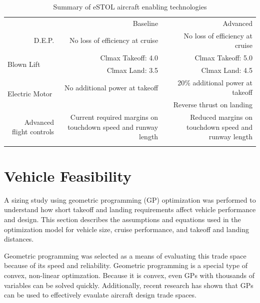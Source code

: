 \documentclass[]{aiaa-tc}%
\begin{document}
\begin{table}[htbp]
  \centering
  \caption{Summary of eSTOL aircraft enabling technologies}
    \begin{tabular}{rrr}
          &       &  \\
    \midrule
          & \multicolumn{1}{p{14.915em}}{Baseline} & \multicolumn{1}{p{14.5em}}{Advanced} \\
    \midrule
    \multicolumn{1}{p{8.415em}}{D.E.P. } & \multicolumn{1}{p{14.915em}}{No loss of efficiency at cruise} & \multicolumn{1}{p{14.5em}}{No loss of efficiency at cruise} \\
    \multicolumn{1}{l}{\multirow{2}[0]{*}{Blown Lift}} & \multicolumn{1}{p{14.915em}}{Clmax Takeoff: 4.0} & \multicolumn{1}{p{14.5em}}{Clmax Takeoff: 5.0} \\
          & \multicolumn{1}{p{14.915em}}{Clmax Land: 3.5} & \multicolumn{1}{p{14.5em}}{Clmax Land: 4.5} \\
    \multicolumn{1}{l}{\multirow{2}[0]{*}{Electric Motor}} & \multicolumn{1}{p{14.915em}}{No additional power at takeoff} & \multicolumn{1}{p{14.5em}}{20\% additional power at takeoff} \\
          &       & \multicolumn{1}{p{14.5em}}{Reverse thrust on landing} \\
    \multicolumn{1}{p{8.415em}}{Advanced flight controls} & \multicolumn{1}{p{14.915em}}{Current required margins on touchdown speed and runway length} & \multicolumn{1}{p{14.5em}}{Reduced margins on touchdown speed and runway length} \\
    \midrule
          &       &  \\
    \end{tabular}%
  \label{t:tech}%
\end{table}%


\section{Vehicle Feasibility}

A sizing study using geometric programming (GP) optimization was performed to understand how short takeoff and landing requirements affect vehicle performance and design. 
This section describes the assumptions and equations used in the optimization model for vehicle size, cruise performance, and takeoff and landing distances.

Geometric programming was selected as a means of evaluating this trade space because of its speed and reliability.  
Geometric programming is a special type of convex, non-linear optimzation\cite{gp}.
Because it is convex, even GPs with thousands of variables can be solved quickly\cite{gp}.
Additionally, recent research has shown that GPs can be used to effectively evaulate aircraft design trade spaces\cite{burton_solar_2017}\cite{gpkit}.
\end{document}
